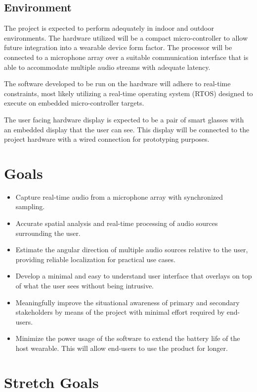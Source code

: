 \documentclass{article}
\begin{document}
\subsection{Environment}
The project is expected to perform adequately in indoor and outdoor environments.
The hardware utilized will be a compact micro-controller to allow future integration into
a wearable device form factor. The processor will be connected to a microphone
array over a suitable communication interface that is able to accommodate multiple
audio streams with adequate latency.

The software developed to be run on the hardware
will adhere to real-time constraints, most likely utilizing a real-time operating
system (RTOS) designed to execute on embedded micro-controller targets. 

The user facing hardware display is expected to be a pair of smart glasses with
an embedded display that the user can see. This display will be connected to the 
project hardware with a wired connection for prototyping purposes. 

\section{Goals}

\begin{itemize}
    \item Capture real-time audio from a microphone array with synchronized
    sampling.
    \item Accurate spatial analysis and real-time processing of audio sources
    surrounding the user.
    \item Estimate the angular direction of multiple audio sources relative
    to the user, providing reliable localization for practical use cases.
    \item Develop a minimal and easy to understand user interface that overlays
    on top of what the user sees without being intrusive.
    \item Meaningfully improve the situational awareness of primary and secondary
    stakeholders by means of the project with minimal effort required by end-users.
    \item Minimize the power usage of the software to extend the battery life of
    the host wearable. This will allow end-users to use the product for longer.
\end{itemize}
\section{Stretch Goals}
\end{document}
